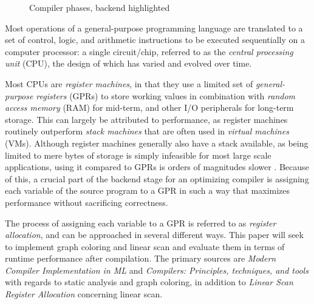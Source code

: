\documentclass{article}
\begin{document}
\begin{figure}[h]
{}
\caption{Compiler phases, backend highlighted}\label{fig:phases}
\end{figure}
\noindent Most operations of a general-purpose programming language are translated to a set of control, logic, and arithmetic instructions to be executed sequentially on a computer processor: a single circuit/chip, referred to as the \textit{central processing unit} (CPU), the design of which has varied and evolved over time.

Most CPUs are \textit{register machines}, in that they use a limited set of \textit{general-purpose registers} (GPRs) to store working values in combination with \textit{random access memory} (RAM) for mid-term, and other I/O peripherals for long-term storage. This can largely be attributed to performance, as register machines routinely outperform \textit{stack machines} \parencite{ShiYunhe2008VmsS} that are often used in \textit{virtual machines} (VMs).
Although register machines generally also have a stack available, as being limited to mere bytes of storage is simply infeasible for most large scale applications, using it compared to GPRs is orders of magnitudes slower \cite{latency}. %
Because of this, a crucial part of the backend stage for an optimizing compiler is assigning each variable  of the source program to a GPR in such a way that maximizes performance without sacrificing correctness.



The process of assigning each variable to a GPR is referred to as \textit{register allocation}, and can be approached in several different ways. This paper will seek to implement graph coloring and linear scan and evaluate them in terms of runtime performance after compilation. %
The primary sources are \textit{Modern Compiler Implementation in ML} \parencite{tiger} and \textit{Compilers: Principles, techniques, and tools} \parencite{dragon} with regards to static analysis and graph coloring, in addition to \textit{Linear Scan Register Allocation} \cite{linear} concerning linear scan.
\end{document}
